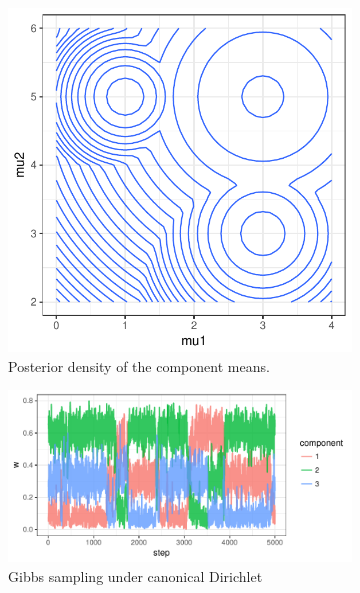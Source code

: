 \documentclass[10pt]{article}
\DeclareMathOperator{\1}{\mathbbm{1}}
\begin{document}
\begin{figure}[H]
\begin{center}
   \begin{subfigure}[b]{0.3\textwidth}
    \includegraphics[width=1\textwidth]{fmm_mu_contour.pdf}
    \caption{Posterior density of the component means.}
    \end{subfigure}
    \end{center}
    \centering
   \begin{subfigure}[b]{0.32\textwidth}
    \includegraphics[width=1\textwidth]{fmm_w_gibbs.pdf}
    \caption{Gibbs sampling under canonical Dirichlet}
    \end{subfigure}
       \begin{subfigure}[b]{0.32\textwidth}

\end{subfigure}
\end{figure}
\end{document}
